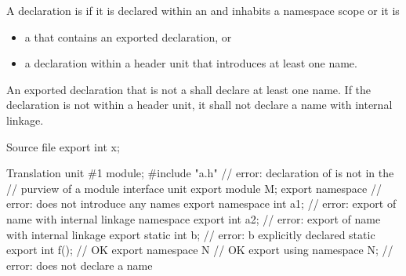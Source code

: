 \pnum
A declaration is  if it is
declared within an  and
inhabits a namespace scope or it is
\begin{itemize}
\item a  that contains an
      exported declaration, or
\item a declaration within a header unit
      that introduces at least one name.
\end{itemize}

\pnum
An exported declaration
that is not a 
shall declare at least one name.
If the declaration is not within a header unit,
it shall not declare a name with internal linkage.

\pnum
\begin{example}
\begin{codeblocktu}{Source file }
export int x;
\end{codeblocktu}

\begin{codeblocktu}{Translation unit \#1}
module;
#include "a.h"                  // error: declaration of  is not in the
                                // purview of a module interface unit
export module M;
export namespace {}             // error: does not introduce any names
export namespace {
  int a1;                       // error: export of name with internal linkage
}
namespace {
  export int a2;                // error: export of name with internal linkage
}
export static int b;            // error: b explicitly declared static
export int f();                 // OK
export namespace N { }          // OK
export using namespace N;       // error: does not declare a name
\end{codeblocktu}
\end{example}

